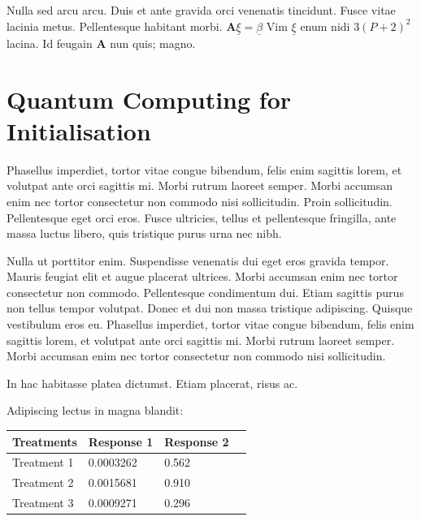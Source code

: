 \documentclass[a0,portrait]{a0poster}
\begin{document}
\begin{multicols}{2}
Nulla sed arcu arcu. Duis et ante gravida orci venenatis tincidunt. Fusce vitae lacinia metus. Pellentesque habitant morbi. $\mathbf{A}\underline{\xi}=\underline{\beta}$ Vim $\underline{\xi}$ enum nidi $3(P+2)^{2}$ lacina. Id feugain $\mathbf{A}$ nun quis; magno.

\section*{Quantum Computing for Initialisation}%
Phasellus imperdiet, tortor vitae congue bibendum, felis enim sagittis lorem, et volutpat ante orci sagittis mi. Morbi rutrum laoreet semper. Morbi accumsan enim nec tortor consectetur non commodo nisi sollicitudin. Proin sollicitudin. Pellentesque eget orci eros. Fusce ultricies, tellus et pellentesque fringilla, ante massa luctus libero, quis tristique purus urna nec nibh.

Nulla ut porttitor enim. Suspendisse venenatis dui eget eros gravida tempor. Mauris feugiat elit et augue placerat ultrices. Morbi accumsan enim nec tortor consectetur non commodo. Pellentesque condimentum dui. Etiam sagittis purus non tellus tempor volutpat. Donec et dui non massa tristique adipiscing. Quisque vestibulum eros eu. Phasellus imperdiet, tortor vitae congue bibendum, felis enim sagittis lorem, et volutpat ante orci sagittis mi. Morbi rutrum laoreet semper. Morbi accumsan enim nec tortor consectetur non commodo nisi sollicitudin.



In hac habitasse platea dictumst. Etiam placerat, risus ac.

Adipiscing lectus in magna blandit:

\begin{center}\vspace{1cm}
\begin{tabular}{l l l l}
\toprule
\textbf{Treatments} & \textbf{Response 1} & \textbf{Response 2} \\
\midrule
Treatment 1 & 0.0003262 & 0.562 \\
Treatment 2 & 0.0015681 & 0.910 \\
Treatment 3 & 0.0009271 & 0.296 \\
\bottomrule
\end{tabular}
\end{center}\vspace{1cm}


\end{multicols}
\end{document}
